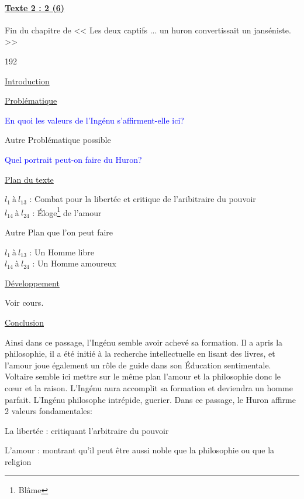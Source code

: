 \documentclass[12pt,a4paper]{article}
\begin{document}
							\paragraph[Texte 2 (6)]{\textbf{\underline{Texte 2 : 2 (6) }}}
		Fin du chapitre \textsc{} de << Les deux captifs ... un huron convertissait un janséniste. >>
\begin{dingautolist}{192}

\item \underline{Introduction} \par

\item \underline{Probl\'ematique }\par
	\textcolor{blue}{En quoi les valeurs de l'Ingénu s'affirment-elle ici?}\par
	Autre Problématique possible \par
	\textcolor{blue}{Quel portrait peut-on faire du Huron?}


\item \underline{Plan du texte} \par
	$l_{1}~$\`a$~l_{13}$ : Combat pour la libertée et critique de l'aribitraire du pouvoir\\
    $l_{14}~$\`a$~l_{24}$ : \'Eloge\footnote{Blâme} de l'amour \par
Autre Plan que l'on peut faire\par
	$l_{1}~$\`a$~l_{13}$ : Un Homme libre\\
    $l_{14}~$\`a$~l_{24}$ : Un Homme amoureux


\item \underline{D\'eveloppement} \par
        Voir cours.

\item \underline{Conclusion} \par
	Ainsi dans ce passage, l'Ingénu semble avoir achevé sa formation.
	Il a apris la philosophie, il a été initié à la recherche intellectuelle en lisant des livres, et l'amour joue également un rôle de guide dans son \'Education sentimentale. 
	Voltaire semble ici mettre sur le même plan l'amour et la philosophie donc le c\oe ur et la raison.
	L'Ingénu aura accomplit sa formation et deviendra un homme parfait.
	L'Ingénu philosophe intrépide, guerier.
	Dans ce passage, le Huron affirme 2 valeurs fondamentales:\par
	La libertée : critiquant l'arbitraire du pouvoir\par
	L'amour : montrant qu'il peut être aussi noble que la philosophie ou que la religion \par

\end{dingautolist}
 \newpage
\end{document}
